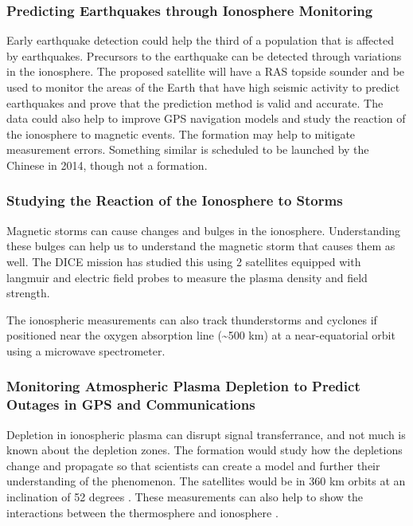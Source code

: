 \subsubsection{Predicting Earthquakes through Ionosphere Monitoring}

Early earthquake detection could help the third of a population that
is affected by earthquakes. Precursors to the earthquake can be detected
through variations in the ionosphere. The proposed satellite will
have a RAS topside sounder and be used to monitor the areas of the
Earth that have high seismic activity to predict earthquakes and prove
that the prediction method is valid and accurate. The data could also
help to improve GPS navigation models and study the reaction of the
ionosphere to magnetic events. The formation may help to mitigate
measurement errors.\cite{Ref:Jason} Something similar is scheduled
to be launched by the Chinese in 2014, though not a formation\cite{Ref:Earthquake}. 


\subsubsection{Studying the Reaction of the Ionosphere to Storms }

Magnetic storms can cause changes and bulges in the ionosphere. Understanding
these bulges can help us to understand the magnetic storm that causes
them as well. The DICE mission has studied this using 2 satellites
equipped with langmuir and electric field probes to measure the plasma
density and field strength. \cite{Ref:Crowley,Ref:Fish}

The ionospheric measurements can also track thunderstorms and cyclones
if positioned near the oxygen absorption line (\textasciitilde{}500
km) at a near-equatorial orbit using a microwave spectrometer. \cite{Ref:Blackwell}


\subsubsection{Monitoring Atmospheric Plasma Depletion to Predict Outages in GPS and Communications}

Depletion in ionospheric plasma can disrupt signal transferrance,
and not much is known about the depletion zones. The formation would
study how the depletions change and propagate so that scientists can
create a model and further their understanding of the phenomenon.
The satellites would be in 360 km orbits at an inclination of 52 degrees
\cite{Ref:Krause}\cite{Ref:Bracikowski}. These measurements can
also help to show the interactions between the thermosphere and ionosphere
\cite{Ref:Blalthazor}.

